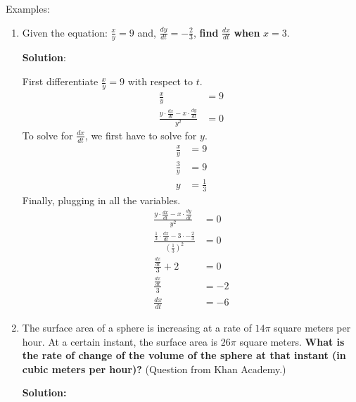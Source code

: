 \documentclass[12pt]{article}
\begin{document}
\noindent Examples:
\begin{enumerate}
    \item Given the equation: $\frac{x}{y} = 9$ and, $\frac{dy}{dt} = -\frac{2}{3}$, \textbf{find} $\frac{dx}{dt}$ \textbf{when} $x=3$.

          \noindent \textbf{Solution}:

          \noindent First differentiate $\frac{x}{y} = 9$ with respect to $t$.
          \begin{align*}
              \frac{x}{y}                                               & = 9 \\[6pt]
              \frac{y \cdot \frac{dx}{dt} - x \cdot \frac{dy}{dt}}{y^2} & = 0
          \end{align*}
          To solve for $\frac{dx}{dt}$, we first have to solve for $y$.
          \begin{align*}
              \frac{x}{y} & = 9           \\[6pt]
              \frac{3}{y} & = 9           \\[6pt]
              y           & = \frac{1}{3}
          \end{align*}
          Finally, plugging in all the variables.
          \begin{align*}
              \frac{y \cdot \frac{dx}{dt} - x \cdot \frac{dy}{dt}}{y^2}                                   & = 0  \\[6pt]
              \frac{\frac{1}{3} \cdot \frac{dx}{dt} - 3 \cdot -\frac{2}{3}}{\left( \frac{1}{3} \right)^2} & = 0  \\[6pt]
              \frac{\frac{dx}{dt} }{3} + 2                                                                & = 0  \\[6pt]
              \frac{\frac{dx}{dt}}{3}                                                                     & = -2 \\[6pt]
              \frac{dx}{dt}                                                                               & = -6
          \end{align*}
          \smallskip

    \item The surface area of a sphere is increasing at a rate of $14 \pi$ square meters per hour. At a certain instant, the surface area is $26 \pi$ square meters. \textbf{What is the rate of change of the volume of the sphere at that instant (in cubic meters per hour)?} (Question from Khan Academy.)

          \noindent \textbf{Solution:}


\end{enumerate}
\end{document}
